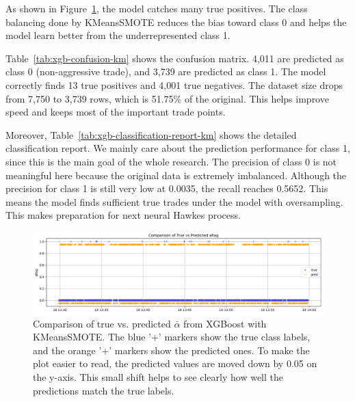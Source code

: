 As shown in Figure~\ref{fig:xgb-pred-vs-true-km}, the model catches many true positives. The class balancing done by KMeansSMOTE reduces the bias toward class 0 and helps the model learn better from the underrepresented class 1.

Table~\ref{tab:xgb-confusion-km} shows the confusion matrix. 4,011 are predicted as class 0 (non-aggressive trade), and 3,739 are predicted as class 1. The model correctly finds 13 true positives and 4,001 true negatives. The dataset size drops from 7,750 to 3,739 rows, which is 51.75\% of the original. This helps improve speed and keeps most of the important trade points.

Moreover, Table~\ref{tab:xgb-classification-report-km} shows the detailed classification report. We mainly care about the prediction performance for class 1, since this is the main goal of the whole research. The precision of class 0 is not meaningful here because the original data is extremely imbalanced. Although the precision for class 1 is still very low at 0.0035, the recall reaches 0.5652. This means the model finds sufficient true trades under the model with oversampling. This makes preparation for next neural Hawkes process.


\begin{figure}[H]
    \centering
    \includegraphics[width=\textwidth]{figures/aflag_XGBoost_181330.png}
    \caption{Comparison of true vs. predicted $\bar{\alpha}$ from XGBoost with KMeansSMOTE. 
    The blue '+' markers show the true class labels, and the orange '+' markers show the predicted ones. To make the plot easier to read, the predicted values are moved down by 0.05 on the y-axis. This small shift helps to see clearly how well the predictions match the true labels.
    }
    \label{fig:xgb-pred-vs-true-km}
\end{figure}

